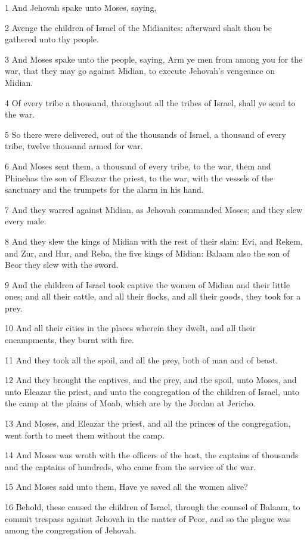 \par 1 And Jehovah spake unto Moses, saying,
\par 2 Avenge the children of Israel of the Midianites: afterward shalt thou be gathered unto thy people.
\par 3 And Moses spake unto the people, saying, Arm ye men from among you for the war, that they may go against Midian, to execute Jehovah's vengeance on Midian.
\par 4 Of every tribe a thousand, throughout all the tribes of Israel, shall ye send to the war.
\par 5 So there were delivered, out of the thousands of Israel, a thousand of every tribe, twelve thousand armed for war.
\par 6 And Moses sent them, a thousand of every tribe, to the war, them and Phinehas the son of Eleazar the priest, to the war, with the vessels of the sanctuary and the trumpets for the alarm in his hand.
\par 7 And they warred against Midian, as Jehovah commanded Moses; and they slew every male.
\par 8 And they slew the kings of Midian with the rest of their slain: Evi, and Rekem, and Zur, and Hur, and Reba, the five kings of Midian: Balaam also the son of Beor they slew with the sword.
\par 9 And the children of Israel took captive the women of Midian and their little ones; and all their cattle, and all their flocks, and all their goods, they took for a prey.
\par 10 And all their cities in the places wherein they dwelt, and all their encampments, they burnt with fire.
\par 11 And they took all the spoil, and all the prey, both of man and of beast.
\par 12 And they brought the captives, and the prey, and the spoil, unto Moses, and unto Eleazar the priest, and unto the congregation of the children of Israel, unto the camp at the plains of Moab, which are by the Jordan at Jericho.
\par 13 And Moses, and Eleazar the priest, and all the princes of the congregation, went forth to meet them without the camp.
\par 14 And Moses was wroth with the officers of the host, the captains of thousands and the captains of hundreds, who came from the service of the war.
\par 15 And Moses said unto them, Have ye saved all the women alive?
\par 16 Behold, these caused the children of Israel, through the counsel of Balaam, to commit trespass against Jehovah in the matter of Peor, and so the plague was among the congregation of Jehovah.
